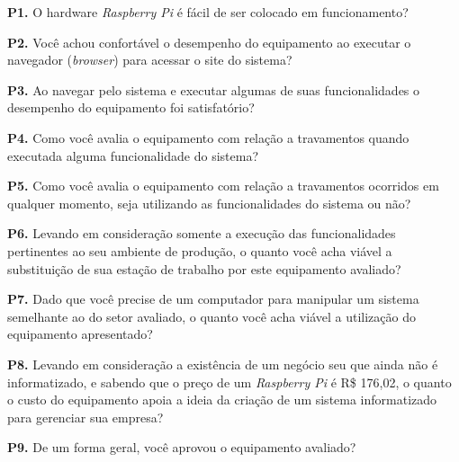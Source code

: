 \textbf{P1.} O hardware \textit{Raspberry Pi} é fácil de ser colocado em funcionamento?

\textbf{P2.} Você achou confortável o desempenho do equipamento ao executar o navegador (\textit{browser}) para acessar o site do sistema?

\textbf{P3.} Ao navegar pelo sistema e executar algumas de suas funcionalidades o desempenho do equipamento foi satisfatório?

\textbf{P4.} Como você avalia o equipamento com relação a travamentos quando executada alguma funcionalidade do sistema?

\textbf{P5.} Como você avalia o equipamento com relação a travamentos ocorridos em qualquer momento, seja utilizando as funcionalidades do sistema ou não?

\textbf{P6.} Levando em consideração somente a execução das funcionalidades pertinentes ao seu ambiente de produção, o quanto você acha viável a substituição de sua estação de trabalho por este equipamento avaliado?

\textbf{P7.} Dado que você precise de um computador para manipular um sistema semelhante ao do setor avaliado, o quanto você acha viável a utilização do equipamento apresentado?

\textbf{P8.} Levando em consideração a existência de um negócio seu que ainda não é informatizado, e sabendo que o preço de um \textit{Raspberry Pi} é  R\$ 176,02, o quanto o custo do equipamento apoia a ideia da criação de um sistema informatizado para gerenciar sua empresa?

\textbf{P9.} De um forma geral, você aprovou o equipamento avaliado?
